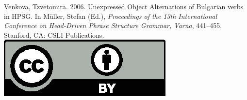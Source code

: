\documentclass[11pt,a4paper,fleqn]{article}
\begin{document}
\noindent



\vfill
\noindent
Venkova, Tzvetomira. 2006. Unexpressed Object Alternations of Bulgarian verbs in HPSG. In Müller, Stefan (Ed.), \emph{{Proceedings of the 13th International Conference on Head-Driven Phrase Structure Grammar, Varna}}, 441--455. Stanford,
CA: CSLI Publications. \hfill\href{http://creativecommons.org/licenses/by/4.0/}{\includegraphics[height=.75em]{Includes/ccby.eps}}

\newpage

\end{document}
